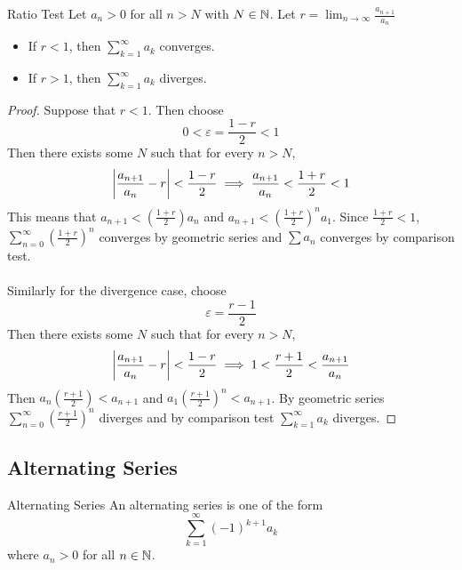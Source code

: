 \documentclass[a4paper]{article}
\begin{document}
\begin{thm}{Ratio Test}{} Let $a_n>0$ for all $n>N$ with $N\in\mathbb{N}$. Let $r=\lim_{n\to\infty}\frac{a_{n+1}}{a_n}$
\begin{itemize} 
\item If $r<1$, then $\sum_{k=1}^\infty a_k$ converges. 
\item If $r>1$, then $\sum_{k=1}^\infty a_k$ diverges. 
\end{itemize} \tcbline
\begin{proof} Suppose that $r<1$. Then choose $$0<\varepsilon=\frac{1-r}{2}<1$$ Then there exists some $N$ such that for every $n>N$, $$\abs{\frac{a_{n+1}}{a_n}-r}<\frac{1-r}{2}\implies\frac{a_{n+1}}{a_n}<\frac{1+r}{2}<1$$ This means that $a_{n+1}<(\frac{1+r}{2})a_n$ and $a_{n+1}<(\frac{1+r}{2})^na_1$. Since $\frac{1+r}{2}<1$, $\sum_{n=0}^{\infty}(\frac{1+r}{2})^n$ converges by geometric series and $\sum a_n$ converges by comparison test. \\~\\
Similarly for the divergence case, choose $$\varepsilon=\frac{r-1}{2}$$ Then there exists some $N$ such that for every $n>N$, $$\abs{\frac{a_{n+1}}{a_n}-r}<\frac{1-r}{2}\implies 1<\frac{r+1}{2}<\frac{a_{n+1}}{a_n}$$ Then $a_n(\frac{r+1}{2})<a_{n+1}$ and $a_1(\frac{r+1}{2})^n<a_{n+1}$. By geometric series $\sum_{n=0}^{\infty}(\frac{r+1}{2})^n$ diverges and by comparison test $\sum_{k=1}^\infty a_k$ diverges. 
\end{proof}
\end{thm}

\subsection{Alternating Series}
\begin{defn}{Alternating Series}{} An alternating series is one of the form $$\sum_{k=1}^{\infty}(-1)^{k+1}a_k$$ where $a_n>0$ for all $n\in\mathbb{N}$. 
\end{defn}
\end{document}
